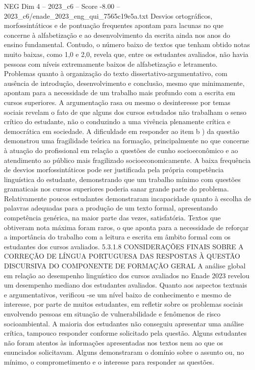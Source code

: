 \begin{textsample}{NEG Dim 4 – 2023\_c6 – Score -8.00 – 2023\_c6/enade\_2023\_eng\_qui\_7565c19e5a.txt}
Desvios ortográficos, morfossintáticos e de pontuação frequentes apontam para lacunas no que concerne à alfabetização e ao desenvolvimento da escrita ainda nos anos do ensino fundamental.
Contudo, o número baixo de textos que tenham obtido notas muito baixas, como 1,0 e 2,0, revela que, entre os estudantes avaliados, não havia pessoas com níveis extremamente baixos de alfabetização e letramento.
Problemas quanto à organização do texto dissertativo-argumentativo, com ausência de introdução, desenvolvimento e conclusão, mesmo que minimamente, apontam para a necessidade de um trabalho mais profundo com a escrita em cursos superiores.
A argumentação rasa ou mesmo o desinteresse por temas sociais revelam o fato de que alguns dos cursos estudados não trabalham o senso crítico do estudante, não o conduzindo a uma vivência plenamente crítica e democrática em sociedade.
A dificuldade em responder ao item b ) da questão demonstrou uma fragilidade teórica na formação, principalmente no que concerne à atuação do profissional em relação a questões de cunho socioeconômico e ao atendimento ao público mais fragilizado socioeconomicamente.
A baixa frequência de desvios morfossintáticos pode ser justificada pela própria competência linguística do estudante, demonstrando que um trabalho mínimo com questões gramaticais nos cursos superiores poderia sanar grande parte do problema.
Relativamente poucos estudantes demonstraram incapacidade quanto à escolha de palavras adequadas para a produção de um texto formal, apresentando competência genérica, na maior parte das vezes, satisfatória.
Textos que obtiveram nota máxima foram raros, o que aponta para a necessidade de reforçar a importância do trabalho com a leitura e escrita em âmbito formal com os estudantes dos cursos avaliados. 5.3.1.8 CONSIDERAÇÕES FINAIS SOBRE A CORREÇÃO DE LÍNGUA PORTUGUESA DAS RESPOSTAS À QUESTÃO DISCURSIVA DO COMPONENTE DE FORMAÇÃO GERAL A análise global em relação ao desempenho linguístico dos cursos avaliados no Enade 2023 revelou um desempenho mediano dos estudantes avaliados.
Quanto aos aspectos textuais e argumentativos, verificou -se um nível baixo de conhecimento e mesmo de interesse, por parte de muitos estudantes, em refletir sobre os problemas sociais envolvendo pessoas em situação de vulnerabilidade e fenômenos de risco socioambiental.
A maioria dos estudantes não conseguiu apresentar uma análise crítica, tampouco responder conforme solicitado pela questão.
Alguns estudantes não foram atentos às informações apresentadas nos textos nem ao que os enunciados solicitavam.
Alguns demonstraram o domínio sobre o assunto ou, no mínimo, o comprometimento e o interesse para responder as questões.

\end{textsample}
